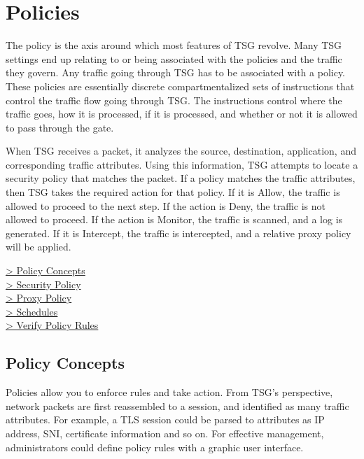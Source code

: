 %
\chapter*{\hypertarget{link:Policies}{Policies}}
\label{sec:policies}

The policy is the axis around which most features of TSG revolve. Many TSG settings end up relating to or being associated with the policies and the traffic they govern. 
Any traffic going through TSG has to be associated with a policy. These policies are essentially discrete compartmentalized sets of instructions that control the traffic flow going through TSG. The instructions control where the traffic goes, how it is processed, if it is processed, and whether or not it is allowed to pass through the gate.


When TSG receives a packet, it analyzes the source, destination, application, and corresponding traffic attributes. Using this information, 
TSG attempts to locate a security policy that matches the packet. If a policy matches the traffic attributes, then TSG takes the required action for that policy. 
If it is Allow, the traffic is allowed to proceed to the next step. If the action is Deny, the traffic is not allowed to proceed. If the action is Monitor, the traffic is scanned, and a log is generated. If it is Intercept, the traffic is intercepted, and a relative proxy policy will be applied. 

{
\color{linkblue}
\hyperlink{link:Policy Concepts}{> Policy Concepts} \\
\hyperlink{link:Security Policy}{> Security Policy} \\
\hyperlink{link:Proxy Policy}{> Proxy Policy}\\
\hyperlink{link:Schedules}{> Schedules}\\
\hyperlink{link:Verify Policy Rules}{> Verify Policy Rules}\\
}
\clearpage

\section*{\hypertarget{link:Policy Concepts}{Policy Concepts}}
\label{sec:policies:concepts}

Policies allow you to enforce rules and take action. From TSG’s perspective, network packets are first reassembled to a session, and identified as many traffic attributes. 
For example, a TLS session could be parsed to attributes as IP address, SNI, certificate information and so on. For effective management, administrators could define policy rules with a graphic user interface. 


